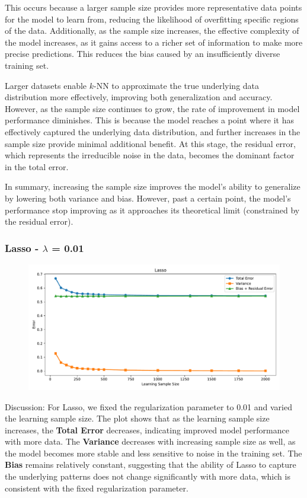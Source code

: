 \documentclass[a4paper,10pt]{article}
\begin{document}
This occurs because a larger sample size provides more representative data points for the model to learn from, reducing the likelihood of overfitting specific regions of the data. Additionally, as the sample size increases, the effective complexity of the model increases, as it gains access to a richer set of information to make more precise predictions. This reduces the bias caused by an insufficiently diverse training set.

Larger datasets enable \(k\)-NN to approximate the true underlying data distribution more effectively, improving both generalization and accuracy. However, as the sample size continues to grow, the rate of improvement in model performance diminishes. This is because the model reaches a point where it has effectively captured the underlying data distribution, and further increases in the sample size provide minimal additional benefit. At this stage, the residual error, which represents the irreducible noise in the data, becomes the dominant factor in the total error.

In summary, increasing the sample size improves the model’s ability to generalize by lowering both variance and bias. However, past a certain point, the model's performance stop improving as it approaches its theoretical limit (constrained by the residual error).


\subsubsection{Lasso - $\lambda$ = 0.01 }

\begin{figure}[H]
    \centering
    \includegraphics[width=0.8\linewidth]{images/2.4_lasso.pdf}
\end{figure}

Discussion:  
For Lasso, we fixed the regularization parameter to 0.01 and varied the learning sample size. The plot shows that as the learning sample size increases, the \textbf{Total Error} decreases, indicating improved model performance with more data. The \textbf{Variance} decreases with increasing sample size as well, as the model becomes more stable and less sensitive to noise in the training set. The \textbf{Bias} remains relatively constant, suggesting that the ability of Lasso to capture the underlying patterns does not change significantly with more data, which is consistent with the fixed regularization parameter.
\end{document}
